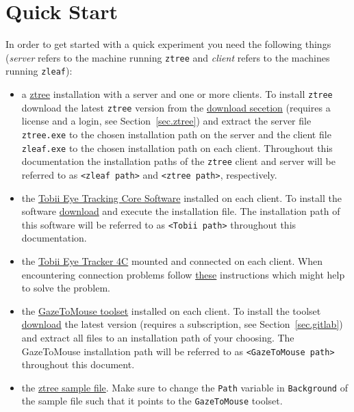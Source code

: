 \documentclass[a4paper,oneside]{book}
\begin{document}
\chapter{Quick Start}
\label{sec.quick}
In order to get started with a quick experiment you need the following things (\emph{server} refers to the machine running \texttt{ztree} and \emph{client} refers to the machines running \texttt{zleaf}):
\begin{itemize}
    \item a \href{http://www.ztree.uzh.ch/en.html}{ztree} installation with a server and one or more clients.
        To install \texttt{ztree} download the latest \texttt{ztree} version from the \href{https://www.uzh.ch/ztree/ssl-dir/index.php}{download secetion} (requires a license and a login, see Section~\ref{sec.ztree}) and extract the server file \texttt{ztree.exe} to the chosen installation path on the server and the client file \texttt{zleaf.exe} to the chosen installation path on each client.
        Throughout this documentation the installation paths of the \texttt{ztree} client and server will be referred to as \texttt{<zleaf path>} and \texttt{<ztree path>}, respectively.
    \item the \href{https://tobiigaming.com/getstarted/}{Tobii Eye Tracking Core Software} installed on each client.
        To install the software \href{https://tobiigaming.com/downloadlatest/?bundle=tobii-core}{download} and execute the installation file.
        The installation path of this software will be referred to as \texttt{<Tobii path>} throughout this documentation.
    \item the \href{https://tobiigaming.com/eye-tracker-4c/}{Tobii Eye Tracker 4C} mounted and connected on each client.
        When encountering connection problems follow \href{https://help.tobii.com/hc/en-us/articles/115000432589-Is-your-Eye-Tracker-4C-not-connecting-}{these} instructions which might help to solve the problem.
    \item the \href{http://tpf.fluido.as:10012/TBI/TBI-tobii_eye_tracker_gaze}{GazeToMouse toolset} installed on each client.
        To install the toolset \href{http://tpf.fluido.as:10012/TBI/TBI-tobii_eye_tracker_gaze/blob/master/release}{download} the latest version (requires a subscription, see Section~\ref{sec.gitlab}) and extract all files to an installation path of your choosing.
        The GazeToMouse installation path will be referred to as \texttt{<GazeToMouse path>} throughout this document.
    \item the \href{http://tpf.fluido.as:10012/TBI/TBI-tobii_eye_tracker_gaze/tree/master/sample}{ztree sample file}.
        Make sure to change the \texttt{Path} variable in \texttt{Background} of the sample file such that it points to the \texttt{GazeToMouse} toolset.
\end{itemize}
\end{document}
